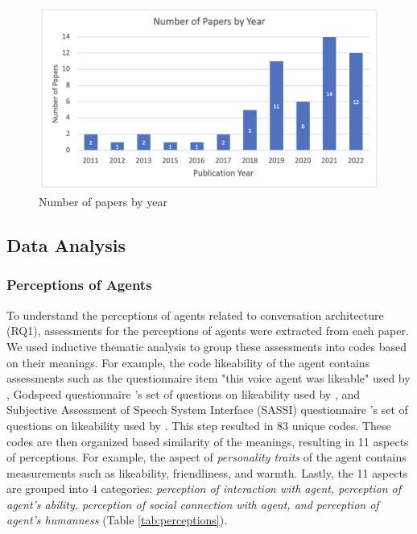 \documentclass[sigconf,screen,review, anonymous]{acmart}
\newcommand{\cmt}[1]{}%
\begin{document}
\begin{figure}[h]
  \centering
  \includegraphics[width=\columnwidth]{fig-paper.png}
  \caption{Number of papers by year}
  \label{fig:paper}
\end{figure}

\subsection{Data Analysis}

\subsubsection*{Perceptions of Agents} To understand the perceptions of agents related to conversation architecture (RQ1), assessments for the perceptions of agents were extracted from each paper. We used inductive thematic analysis to group these assessments into codes based on their meanings. For example, the code likeability of the agent contains assessments such as the questionnaire item "this voice agent was likeable" used by \cite{cuadra2021my}\cmt{[67]}, Godspeed questionnaire \cite{bartneck2009measurement}\cmt{godspeed}'s set of questions on likeability used by \cite{linnemann2018can}\cmt{[15]}, and Subjective Assessment of Speech System Interface (SASSI) questionnaire \cite{hone2000towards}\cmt{sassi}'s set of questions on likeability used by \cite{chan2021kinvoices}\cmt{[74]}\cite{choi2020nobody}\cmt{[54]}. This step resulted in 83 unique codes. These codes are then organized based similarity of the meanings, resulting in 11 aspects of perceptions. For example, the aspect of \textit{personality traits} of the agent contains measurements such as likeability, friendliness, and warmth. Lastly, the 11 aspects are grouped into 4 categories: \textit{perception of interaction with agent, perception of agent's ability, perception of social connection with agent, and perception of agent's humanness} (Table \ref{tab:perceptions}).
\end{document}
